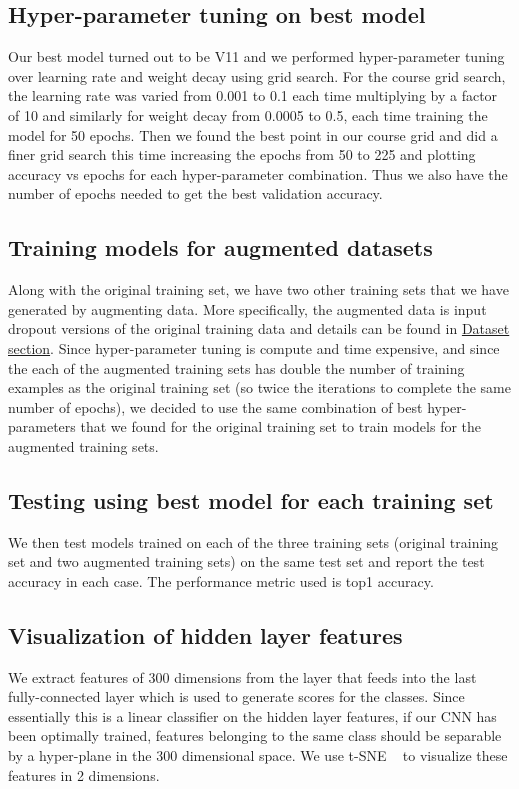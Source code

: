 \documentclass[10pt,twocolumn,letterpaper]{article}
\begin{document}
\subsection{Hyper-parameter tuning on best model}
Our best model turned out to be V11 and we performed hyper-parameter tuning over learning rate and weight decay using grid search. For the course grid search, the learning rate was varied from 0.001 to 0.1 each time multiplying by a factor of 10 and similarly for weight decay from 0.0005 to 0.5, each time training the model for 50 epochs. Then we found the best point in our course grid and did a finer grid search this time increasing the epochs from 50 to 225 and plotting accuracy vs epochs for each hyper-parameter combination. Thus we also have the number of epochs needed to get the best validation accuracy.
\subsection{Training models for augmented datasets}
Along with the original training set, we have two other training sets that we have generated by augmenting data. More specifically, the augmented data is input dropout versions of the original training data and details can be found in \hyperref[sec:dataset_sec]{Dataset section}. Since hyper-parameter tuning is compute and time expensive, and since the each of the augmented training sets has double the number of training examples as the original training set (so twice the iterations to complete the same number of epochs), we decided to use the same combination of best hyper-parameters that we found for the original training set to train models for the augmented training sets.
\subsection{Testing using best model for each training set}
We then test models trained on each of the three training sets (original training set and two augmented training sets) on the same test set and report the test accuracy in each case. The performance metric used is top1 accuracy. 
\subsection{Visualization of hidden layer features}
We extract features of 300 dimensions from the layer that feeds into the last fully-connected layer which is used to generate scores for the classes. Since essentially this is a linear classifier on the hidden layer features, if our CNN has been optimally trained, features belonging to the same class should be separable by a hyper-plane in the 300 dimensional space. We use t-SNE ~\cite{van2008visualizing} to visualize these features in 2 dimensions. 
\end{document}
